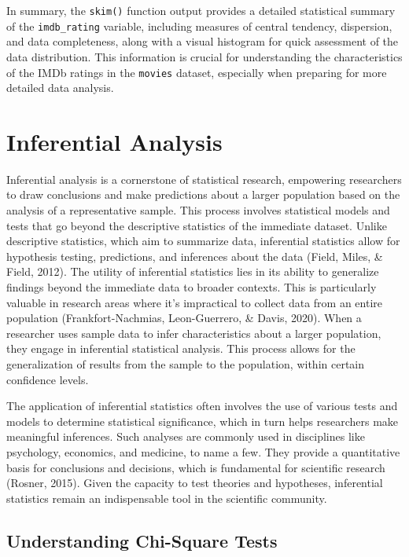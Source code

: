 \documentclass[
]{book}
\begin{document}
In summary, the \texttt{skim()} function output provides a detailed statistical summary of the \texttt{imdb\_rating} variable, including measures of central tendency, dispersion, and data completeness, along with a visual histogram for quick assessment of the data distribution. This information is crucial for understanding the characteristics of the IMDb ratings in the \texttt{movies} dataset, especially when preparing for more detailed data analysis.

\chapter{Inferential Analysis}\label{inferential-analysis}

Inferential analysis is a cornerstone of statistical research, empowering researchers to draw conclusions and make predictions about a larger population based on the analysis of a representative sample. This process involves statistical models and tests that go beyond the descriptive statistics of the immediate dataset. Unlike descriptive statistics, which aim to summarize data, inferential statistics allow for hypothesis testing, predictions, and inferences about the data (Field, Miles, \& Field, 2012). The utility of inferential statistics lies in its ability to generalize findings beyond the immediate data to broader contexts. This is particularly valuable in research areas where it's impractical to collect data from an entire population (Frankfort-Nachmias, Leon-Guerrero, \& Davis, 2020). When a researcher uses sample data to infer characteristics about a larger population, they engage in inferential statistical analysis. This process allows for the generalization of results from the sample to the population, within certain confidence levels.

The application of inferential statistics often involves the use of various tests and models to determine statistical significance, which in turn helps researchers make meaningful inferences. Such analyses are commonly used in disciplines like psychology, economics, and medicine, to name a few. They provide a quantitative basis for conclusions and decisions, which is fundamental for scientific research (Rosner, 2015). Given the capacity to test theories and hypotheses, inferential statistics remain an indispensable tool in the scientific community.

\section{Understanding Chi-Square Tests}\label{understanding-chi-square-tests}
\end{document}
